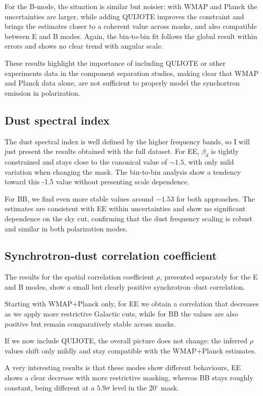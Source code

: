 \documentclass[12pt,a4paper]{article}
\begin{document}
For the B-mode, the situation is similar but noisier: with WMAP and Planck the uncertainties are larger, while adding QUIJOTE improves the constraint and brings the estimates closer to a coherent value across masks, and also compatible between E and B modes. Again, the bin-to-bin fit follows the global result within errors and shows no clear trend with angular scale.

These results highlight the importance of including QUIJOTE or other experiments data in the component separation studies, making clear that WMAP and Planck data alone, are not sufficient to properly model the synchortron emission in polarization.

\subsection{Dust spectral index}

The dust spectral index is well defined by the higher frequency bands, so I will just present the results obtained with the full dataset. For EE, $\beta_d$ is tightly constrained and stays close to the canonical value of $\sim 1.5$, with only mild variation when changing the mask. The bin-to-bin analysis show a tendency toward this -1.5 value without presenting scale dependence. 

For BB, we find even more stable values around $-1.53$ for both approaches. The estimates are consistent with EE within uncertainties and show no significant dependence on the sky cut, confirming that the dust frequency scaling is robust and similar in both polarization modes.

\subsection{Synchrotron-dust correlation coefficient}

The results for the spatial correlation coefficient $\rho$, presented separately for the E and B modes, show a small but clearly positive synchrotron--dust correlation.

Starting with WMAP+Planck only, for EE we obtain a correlation that decreases as we apply more restrictive Galactic cuts, while for BB the values are also positive but remain comparatively stable across masks.

If we now include QUIJOTE, the overall picture does not change: the inferred $\rho$ values shift only mildly and stay compatible with the WMAP+Planck estimates.

A very interesting results is that these modes show different behaviours, EE shows a clear decrease with more restrictive masking, whereas BB stays roughly constant, being different at a $5.9 \sigma$ level in the 20$^{\circ}$ mask. 
\end{document}
